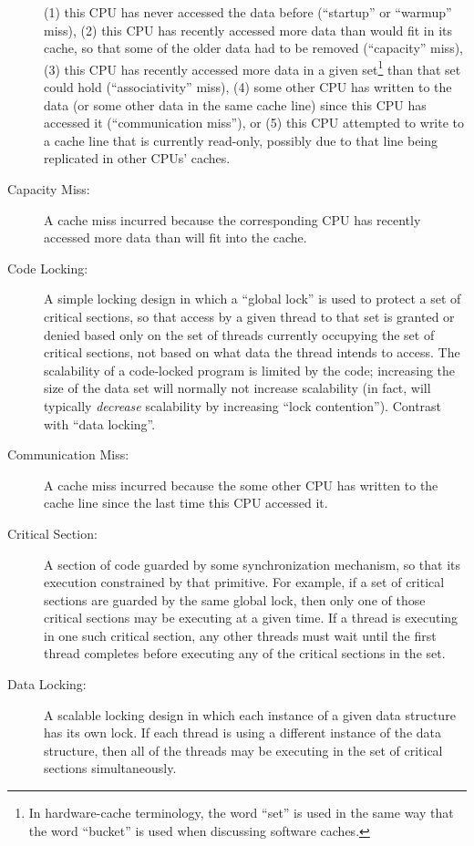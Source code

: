 \begin{description}
	(1) this CPU has never accessed the data before
	(``startup'' or ``warmup'' miss),
	(2) this CPU has recently accessed more
	data than would fit in its cache, so that some of the older
	data had to be removed (``capacity'' miss),
	(3) this CPU
	has recently accessed more data in a given set\footnote{
		In hardware-cache terminology, the word ``set''
		is used in the same way that the word ``bucket''
		is used when discussing software caches.}
	than that set could hold (``associativity'' miss),
	(4) some other CPU has written to the data (or some other
	data in the same cache line) since this CPU has accessed it
	(``communication miss''), or
	(5) this CPU attempted to write to a cache line that is
	currently read-only, possibly due to that line being replicated
	in other CPUs' caches.
\item[Capacity Miss:]
	A cache miss incurred because the corresponding CPU has recently
	accessed more data than will fit into the cache.
\item[Code Locking:]
	A simple locking design in which a ``global lock'' is used to protect
	a set of critical sections, so that access by a given thread
	to that set is
	granted or denied based only on the set of threads currently
	occupying the set of critical sections, not based on what
	data the thread intends to access.
	The scalability of a code-locked program is limited by the code;
	increasing the size of the data set will normally not increase
	scalability (in fact, will typically \emph{decrease} scalability
	by increasing ``lock contention'').
	Contrast with ``data locking''.
\item[Communication Miss:]
	A cache miss incurred because the some other CPU has written to
	the cache line since the last time this CPU accessed it.
\item[Critical Section:]
	A section of code guarded by some synchronization mechanism,
	so that its execution constrained by that primitive.
	For example, if a set of critical sections are guarded by
	the same global lock, then only one of those critical sections
	may be executing at a given time.
	If a thread is executing in one such critical section,
	any other threads must wait until the first thread completes
	before executing any of the critical sections in the set.
\item[Data Locking:]
	A scalable locking design in which each instance of a given
	data structure has its own lock.
	If each thread is using a different instance of the
	data structure, then all of the threads may be executing in
	the set of critical sections simultaneously.

\end{description}
